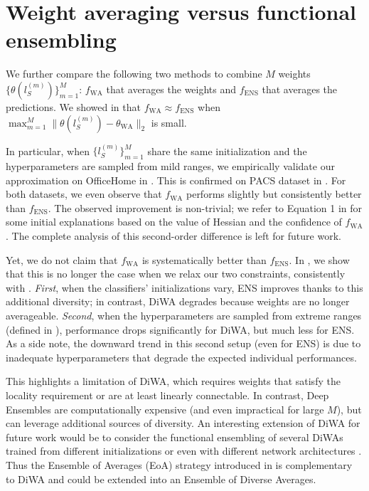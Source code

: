\clearpage
\section{Weight averaging versus functional ensembling}%
\label{app:wa_vs_ens_analysis}%

We further compare the following two methods to combine $M$ weights $\{\theta(l_S^{(m)})\}_{m=1}^M$: $f_{\text{WA}}$ that averages the weights and $f_{\text{ENS}}$ \cite{Lakshminarayanan2017} that averages the predictions.
We showed in  that $f_{\text{WA}} \approx f_{\text{ENS}}$ when $\max_{m=1}^{M}\| \theta(l_S^{(m)}) - \theta_{\text{WA}}\|_2$ is small.

In particular, when $\{l_S^{(m)}\}_{m=1}^M$ share the same initialization and the hyperparameters are sampled from mild ranges, we empirically validate our approximation on OfficeHome in . This is confirmed on PACS dataset in .
For both datasets, we even observe that $f_{\text{WA}}$ performs slightly but consistently better than $f_{\text{ENS}}$. The observed improvement is non-trivial; we refer to Equation 1 in \cite{Wortsman2022ModelSA} for some initial explanations based on the value of \ood Hessian and the confidence of $f_{\text{WA}}$. The complete analysis of this second-order difference is left for future work.

Yet, we do not claim that $f_{\text{WA}}$ is systematically better than $f_{\text{ENS}}$.
In , we show that this is no longer the case when we relax our two constraints, consistently with .
\textit{First}, when the classifiers' initializations vary, ENS improves thanks to this additional diversity; in contrast, DiWA degrades because weights are no longer averageable.
\textit{Second}, when the hyperparameters are sampled from extreme ranges (defined in ), performance drops significantly for DiWA, but much less for ENS.
As a side note, the downward trend in this second setup (even for ENS) is due to inadequate hyperparameters that degrade the expected individual performances.

This highlights a limitation of DiWA, which requires weights that satisfy the locality requirement or are at least linearly connectable.
In contrast, Deep Ensembles \cite{Lakshminarayanan2017} are computationally expensive (and even impractical for large $M$), but can leverage additional sources of diversity.
An interesting extension of DiWA for future work would be to consider the functional ensembling of several DiWAs trained from different initializations or even with different network architectures \cite{singh2016swapout}.
Thus the Ensemble of Averages (EoA) strategy introduced in  \cite{arpit2021ensemble} is complementary to DiWA and could be extended into an Ensemble of Diverse Averages.


